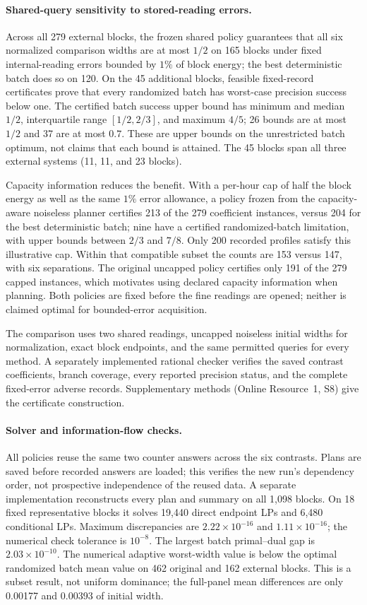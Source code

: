 \documentclass[12pt]{article}
\begin{document}
\FloatBarrier
\paragraph{Shared-query sensitivity to stored-reading errors.}
Across all 279 external blocks, the frozen shared policy guarantees that
all six normalized comparison widths are at most $1/2$ on 165 blocks under
fixed internal-reading errors bounded by $1\%$ of block energy; the best
deterministic batch does so on 120.  On the 45 additional blocks,
feasible fixed-record certificates prove that every randomized batch has
worst-case precision success below one.  The certified batch success
upper bound has minimum and median $1/2$, interquartile range
$[1/2,2/3]$, and maximum $4/5$; 26 bounds are at most $1/2$ and 37 are
at most $0.7$.  These are upper bounds on the unrestricted batch optimum,
not claims that each bound is attained.  The 45 blocks span all three
external systems (11, 11, and 23 blocks).

Capacity information reduces the benefit.  With a per-hour cap of half
the block energy as well as the same $1\%$ error allowance, a policy
frozen from the capacity-aware noiseless planner certifies 213 of the
279 coefficient instances, versus 204 for the best deterministic batch;
nine have a certified randomized-batch limitation, with upper bounds
between $2/3$ and $7/8$.  Only 200 recorded profiles satisfy this illustrative
cap.  Within that compatible subset the counts are 153 versus 147, with
six separations.  The original uncapped policy certifies only 191 of the
279 capped instances, which motivates using declared capacity information
when planning.  Both policies are fixed before the fine readings are
opened; neither is claimed optimal for bounded-error acquisition.

The comparison uses two shared readings, uncapped noiseless initial widths for
normalization, exact block endpoints, and the same permitted queries for
every method.  A separately implemented rational checker verifies the
saved contrast coefficients, branch coverage, every reported precision
status, and the complete fixed-error adverse records.  Supplementary
methods (Online Resource~1, S8) give the certificate construction.
\paragraph{Solver and information-flow checks.}
All policies reuse the same two counter answers across the six contrasts.
Plans are saved before recorded answers are loaded; this verifies the new
run's dependency order, not prospective independence of the reused data.
A separate implementation reconstructs every plan and summary on all 1,098
blocks. On 18 fixed representative blocks it solves 19,440 direct endpoint
LPs and 6,480 conditional LPs. Maximum discrepancies are
$2.22\times10^{-16}$ and $1.11\times10^{-16}$; the numerical check tolerance
is $10^{-8}$. The largest batch primal--dual gap is $2.03\times10^{-10}$.
The numerical adaptive worst-width value is below the optimal randomized
batch mean value on 462 original and 162 external blocks. This is a
subset result, not uniform dominance; the full-panel mean differences are
only 0.00177 and 0.00393 of initial width.
\end{document}
